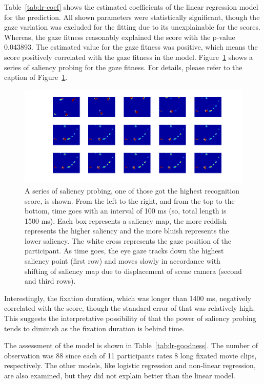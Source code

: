 \documentclass[oneside,master]{snueethesis}
\begin{document}
Table~\ref{tab:lr-coef} shows the estimated coefficients of the linear regression model for the prediction. All shown parameters were statistically significant, though the gaze variation was excluded for the fitting due to its unexplainable for the scores. Whereas, the gaze fitness reasonably explained the score with the p-value 0.043893. The estimated value for the gaze fitness was positive, which means the score positively correlated with the gaze fitness in the model. Figure~\ref{fig:probing} shows a series of saliency probing for the gaze fitness. For details, please refer to the caption of Figure~\ref{fig:probing}.

\begin{figure}
  \centerline{\includegraphics[width=150mm]{./eps/probing.png}}
  \caption[A series of saliency probing]{A series of saliency probing, one of those got the highest recognition score, is shown. From the left to the right, and from the top to the bottom, time goes with an interval of 100 ms (so, total length is 1500 ms). Each box represents a saliency map, the more reddish represents the higher saliency and the more bluish represents the lower saliency. The white cross represents the gaze position of the participant. As time goes, the eye gaze tracks down the highest saliency point (first row) and moves slowly in accordance with shifting of saliency map due to displacement of scene camera (second and third rows).}
  \label{fig:probing}
\end{figure}

Interestingly, the fixation duration, which was longer than 1400 ms, negatively correlated with the score, though the standard error of that was relatively high. This suggests the interpretative possibility of that the power of saliency probing tends to diminish as the fixation duration is behind time.

The assessment of the model is shown in Table~\ref{tab:lr-goodness}. The number of observation was 88 since each of 11 participants rates 8 long fixated movie clips, respectively. The other models, like logistic regression and non-linear regression, are also examined, but they did not explain better than the linear model.
\end{document}
